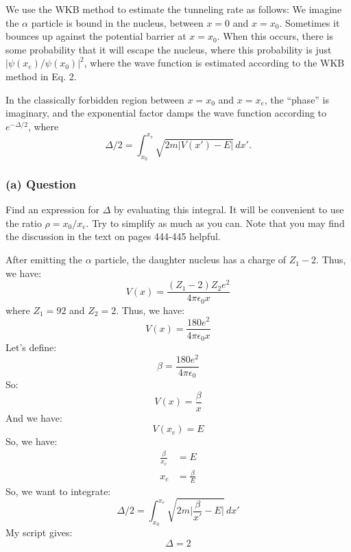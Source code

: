 \documentclass{article}
\begin{document}
We use the WKB method to estimate the tunneling rate as follows: We imagine the \( \alpha \) particle is bound in the nucleus, between \( x = 0 \) and \( x = x_0 \). Sometimes it bounces up against the potential barrier at \( x = x_0 \). When this occurs, there is some probability that it will escape the nucleus, where this probability is just \( |\psi(x_e)/\psi(x_0)|^2 \), where the wave function is estimated according to the WKB method in Eq. 2.

In the classically forbidden region between \( x = x_0 \) and \( x = x_e \), the ``phase'' is imaginary, and the exponential factor damps the wave function according to \( e^{-\Delta/2} \), where
\begin{equation}
    \Delta/2 = \int_{x_0}^{x_e} \sqrt{2m\lvert V(x') - E \rvert}\,dx'.
\end{equation}

\subsubsection*{(a) Question}
Find an expression for \( \Delta \) by evaluating this integral. It will be convenient to use the ratio \( \rho = x_0/x_e \). Try to simplify as much as you can. Note that you may find the discussion in the text on pages 444-445 helpful.

After emitting the \( \alpha \) particle, the daughter nucleus has a charge of \( Z_1 - 2 \). Thus, we have:
\begin{equation}
    V(x) = \frac{(Z_1 - 2)Z_2e^2}{4\pi \epsilon_0 x}
\end{equation}
where \( Z_1 = 92 \) and \( Z_2 = 2 \). Thus, we have:
\begin{equation}
    V(x) = \frac{180e^2}{4\pi \epsilon_0 x}
\end{equation}
Let's define:
\begin{equation}
    \beta = \frac{180e^2}{4\pi \epsilon_0}
\end{equation}
So:
\begin{equation}
    V(x) = \frac{\beta}{x}
\end{equation}
And we have:
\begin{equation}
    V(x_e) = E
\end{equation}
So, we have:
\begin{align}
    \frac{\beta}{x_e} &= E \\
    x_e &= \frac{\beta}{E}
\end{align}
So, we want to integrate:
\begin{equation}
    \Delta/2 = \int_{x_0}^{x_e} \sqrt{2m\lvert \frac{\beta}{x'} - E \rvert}\,dx'
\end{equation}
My script gives:
\begin{equation}
    \Delta = 2
\end{equation}
\end{document}
